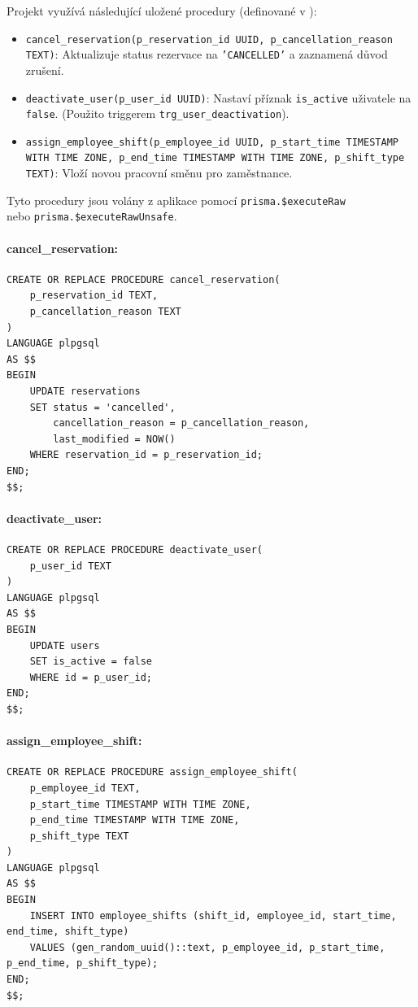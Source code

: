 \documentclass[12pt, a4paper]{article}
\begin{document}
Projekt využívá následující uložené procedury (definované v ):

\begin{itemize}
    \item \texttt{cancel\_reservation(p\_reservation\_id UUID, p\_cancellation\_reason TEXT)}: Aktualizuje status rezervace na \texttt{'CANCELLED'} a zaznamená důvod zrušení.
    \item \texttt{deactivate\_user(p\_user\_id UUID)}: Nastaví příznak \texttt{is\_active} uživatele na \texttt{false}. (Použito triggerem \texttt{trg\_user\_deactivation}).
    \item \texttt{assign\_employee\_shift(p\_employee\_id UUID, p\_start\_time TIMESTAMP WITH TIME ZONE, p\_end\_time TIMESTAMP WITH TIME ZONE, p\_shift\_type TEXT)}: Vloží novou pracovní směnu pro zaměstnance.
\end{itemize}
Tyto procedury jsou volány z aplikace pomocí \texttt{prisma.\$executeRaw} \\ nebo \texttt{prisma.\$executeRawUnsafe}.

\paragraph{cancel\_reservation:}
\begin{lstlisting}
CREATE OR REPLACE PROCEDURE cancel_reservation(
    p_reservation_id TEXT,
    p_cancellation_reason TEXT
)
LANGUAGE plpgsql
AS $$
BEGIN
    UPDATE reservations
    SET status = 'cancelled',
        cancellation_reason = p_cancellation_reason,
        last_modified = NOW()
    WHERE reservation_id = p_reservation_id;
END;
$$;
\end{lstlisting}

\paragraph{deactivate\_user:}
\begin{lstlisting}
CREATE OR REPLACE PROCEDURE deactivate_user(
    p_user_id TEXT
)
LANGUAGE plpgsql
AS $$
BEGIN
    UPDATE users
    SET is_active = false
    WHERE id = p_user_id;
END;
$$;
\end{lstlisting}

\paragraph{assign\_employee\_shift:}
\begin{lstlisting}
CREATE OR REPLACE PROCEDURE assign_employee_shift(
    p_employee_id TEXT,
    p_start_time TIMESTAMP WITH TIME ZONE,
    p_end_time TIMESTAMP WITH TIME ZONE,
    p_shift_type TEXT
)
LANGUAGE plpgsql
AS $$
BEGIN
    INSERT INTO employee_shifts (shift_id, employee_id, start_time, end_time, shift_type)
    VALUES (gen_random_uuid()::text, p_employee_id, p_start_time, p_end_time, p_shift_type);
END;
$$;
\end{lstlisting}
\end{document}
